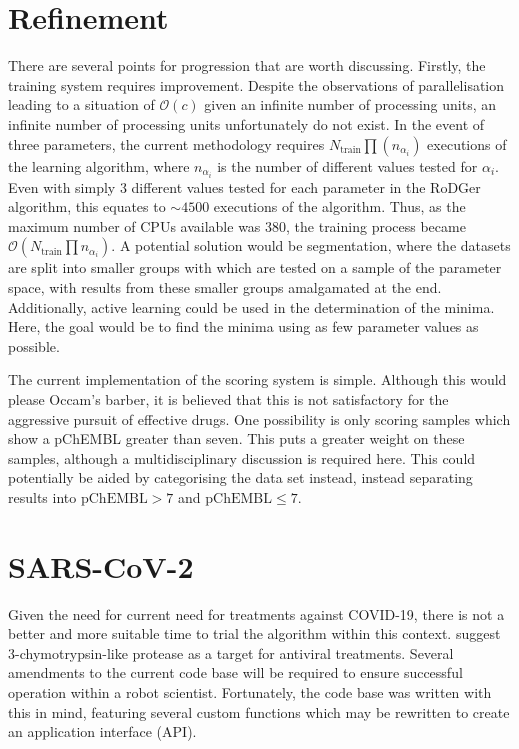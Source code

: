 \section{Refinement}
There are several points for progression that are worth discussing. Firstly, the training system requires improvement. Despite the observations of parallelisation leading to a situation of $\mathcal{O}(c)$ given an infinite number of processing units, an infinite number of processing units unfortunately do not exist. In the event of three parameters, the current methodology requires $N_\mathrm{train}\prod(n_{\alpha_i})$ executions of the learning algorithm, where $n_{\alpha_i}$ is the number of different values tested for $\alpha_i$. Even with simply 3 different values tested for each parameter in the RoDGer algorithm, this equates to $\sim{}4500$ executions of the algorithm. Thus, as the maximum number of CPUs available was 380, the training process became $\mathcal{O}\left(N_\mathrm{train}\prod{n_{\alpha_i}}\right)$. A potential solution would be segmentation, where the datasets are split into smaller groups with which are tested on a sample of the parameter space, with results from these smaller groups amalgamated at the end. Additionally, active learning could be used in the determination of the minima. Here, the goal would be to find the minima using as few parameter values as possible.

The current implementation of the scoring system is simple. Although this would please Occam's barber, it is believed that this is not satisfactory for the aggressive pursuit of effective drugs. One possibility is only scoring samples which show a pChEMBL greater than seven. This puts a greater weight on these samples, although a multidisciplinary discussion is required here. This could potentially be aided by categorising the data set instead, instead separating results into $\mathrm{pChEMBL}>7$ and $\mathrm{pChEMBL}\leq{}7$.

\section{SARS-CoV-2}
Given the need for current need for treatments against COVID-19, there is not a better and more suitable time to trial the algorithm within this context. \textcite{prot20} suggest 3-chymotrypsin-like protease as a target for antiviral treatments. Several amendments to the current code base will be required to ensure successful operation within a robot scientist. Fortunately, the code base was written with this in mind, featuring several custom functions which may be rewritten to create an application interface (API).